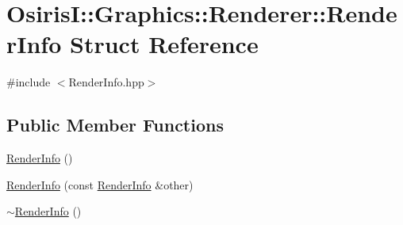 \hypertarget{struct_osiris_i_1_1_graphics_1_1_renderer_1_1_render_info}{\section{Osiris\-I\-:\-:Graphics\-:\-:Renderer\-:\-:Render\-Info Struct Reference}
\label{struct_osiris_i_1_1_graphics_1_1_renderer_1_1_render_info}
}


{\ttfamily \#include $<$Render\-Info.\-hpp$>$}

\subsection*{Public Member Functions}
\begin{DoxyCompactItemize}
\item 
\hyperlink{struct_osiris_i_1_1_graphics_1_1_renderer_1_1_render_info_a35b624f87d8b106b9c3f093c27db1dfd}{Render\-Info} ()
\item 
\hyperlink{struct_osiris_i_1_1_graphics_1_1_renderer_1_1_render_info_a0024acc1bf3e8b4f163bcc2e1a31f490}{Render\-Info} (const \hyperlink{struct_osiris_i_1_1_graphics_1_1_renderer_1_1_render_info}{Render\-Info} \&other)
\item 
\hyperlink{struct_osiris_i_1_1_graphics_1_1_renderer_1_1_render_info_a461c7555665f77131bfa16dc686c1a17}{$\sim$\-Render\-Info} ()
\end{DoxyCompactItemize}
